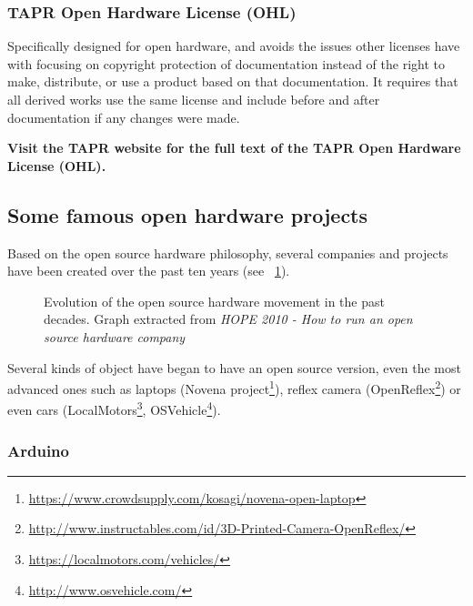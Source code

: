 \subsubsection{TAPR Open Hardware License (OHL)}
Specifically designed for open hardware, and avoids the issues other licenses have with focusing on copyright protection of documentation instead of the right to make, distribute, or use a product based on that documentation. It requires that all derived works use the same license and include before and after documentation if any changes were made.

\textbf{Visit the TAPR website for the full text of the TAPR Open Hardware License (OHL).}


\subsection{Some famous open hardware projects} %

Based on the open source hardware philosophy, several companies and projects have been created over the past ten years (see \figurename~\ref{fig:oh_evolution}).

\begin{figure}[ht]
\centering
    \hfil
    \caption{Evolution of the open source hardware movement in the past decades. Graph extracted from \emph{HOPE 2010 - How to run an open source hardware company}}
    \label{fig:oh_evolution}
\end{figure}


Several kinds of object have began to have an open source version, even the most advanced ones such as laptops (Novena project\footnote{\url{https://www.crowdsupply.com/kosagi/novena-open-laptop}}), reflex camera (OpenReflex\footnote{\url{http://www.instructables.com/id/3D-Printed-Camera-OpenReflex/}}) or even cars (LocalMotors\footnote{\url{https://localmotors.com/vehicles/}}, OSVehicle\footnote{\url{http://www.osvehicle.com/}}).


\subsubsection{Arduino} %

